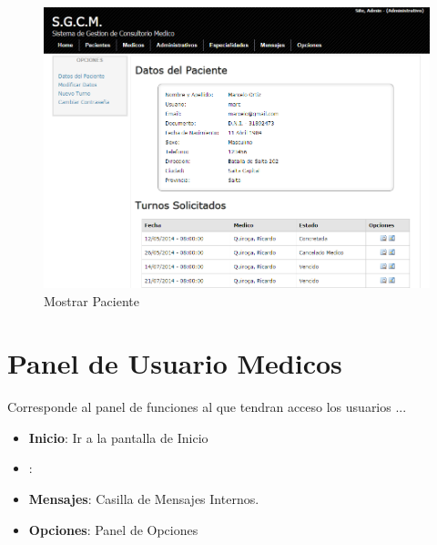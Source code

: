 \begin{figure}[H]
    \centering
    \includegraphics[scale=0.5]{resourse/datos-paciente-a.png}
    \caption{Mostrar Paciente}
    \label{fig:613}
\end{figure}



\section{Panel de Usuario Medicos}

Corresponde al panel de funciones al que tendran acceso los usuarios ...

\begin{itemize}
    \item \textbf{Inicio}: Ir a la pantalla de Inicio
    \item \textbf{}: 
    \item \textbf{Mensajes}: Casilla de Mensajes Internos.
    \item \textbf{Opciones}: Panel de Opciones
\end{itemize}
